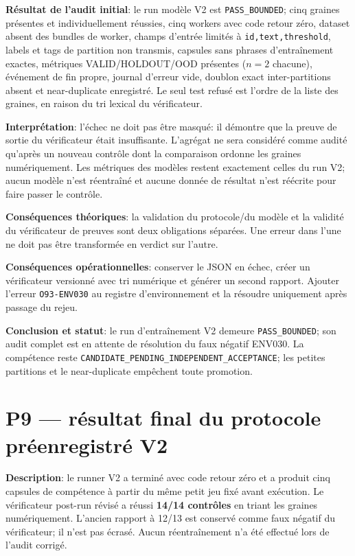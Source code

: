\documentclass[11pt,a4paper,oneside]{report}
\begin{document}
\textbf{Résultat de l'audit initial}: le run modèle V2 est \texttt{PASS\_BOUNDED}; cinq graines présentes et individuellement réussies, cinq workers avec code retour zéro, dataset absent des bundles de worker, champs d'entrée limités à \texttt{id,text,threshold}, labels et tags de partition non transmis, capsules sans phrases d'entraînement exactes, métriques VALID/HOLDOUT/OOD présentes (\(n=2\) chacune), événement de fin propre, journal d'erreur vide, doublon exact inter-partitions absent et near-duplicate enregistré. Le seul test refusé est l'ordre de la liste des graines, en raison du tri lexical du vérificateur.

\textbf{Interprétation}: l'échec ne doit pas être masqué: il démontre que la preuve de sortie du vérificateur était insuffisante. L'agrégat ne sera considéré comme audité qu'après un nouveau contrôle dont la comparaison ordonne les graines numériquement. Les métriques des modèles restent exactement celles du run V2; aucun modèle n'est réentraîné et aucune donnée de résultat n'est réécrite pour faire passer le contrôle.

\textbf{Conséquences théoriques}: la validation du protocole/du modèle et la validité du vérificateur de preuves sont deux obligations séparées. Une erreur dans l'une ne doit pas être transformée en verdict sur l'autre.

\textbf{Conséquences opérationnelles}: conserver le JSON en échec, créer un vérificateur versionné avec tri numérique et générer un second rapport. Ajouter l'erreur \texttt{O93-ENV030} au registre d'environnement et la résoudre uniquement après passage du rejeu.

\textbf{Conclusion et statut}: le run d'entraînement V2 demeure \texttt{PASS\_BOUNDED}; son audit complet est en attente de résolution du faux négatif ENV030. La compétence reste \texttt{CANDIDATE\_\allowbreak PENDING\_\allowbreak INDEPENDENT\_\allowbreak ACCEPTANCE}; les petites partitions et le near-duplicate empêchent toute promotion.


\chapter{P9 — résultat final du protocole préenregistré V2}
\textbf{Description}: le runner V2 a terminé avec code retour zéro et a produit cinq capsules de compétence à partir du même petit jeu fixé avant exécution. Le vérificateur post-run révisé a réussi \textbf{14/14 contrôles} en triant les graines numériquement. L'ancien rapport à 12/13 est conservé comme faux négatif du vérificateur; il n'est pas écrasé. Aucun réentraînement n'a été effectué lors de l'audit corrigé.
\end{document}

